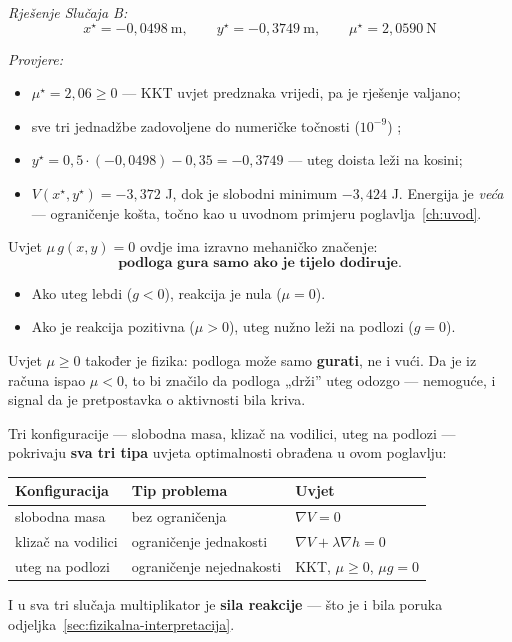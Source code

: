 \emph{Rješenje Slučaja B:}
\[
\boxed{\;
x^\star = -0{,}0498\ \text{m}, \qquad
y^\star = -0{,}3749\ \text{m}, \qquad
\mu^\star = 2{,}0590\ \text{N}
\;}
\]

\emph{Provjere:}
\begin{itemize}
  \item $\mu^\star = 2{,}06 \ge 0$ \checkmark --- KKT uvjet predznaka vrijedi,
        pa je rješenje valjano;
  \item sve tri jednadžbe zadovoljene do numeričke točnosti ($10^{-9}$)
        \checkmark;
  \item $y^\star = 0{,}5\cdot(-0{,}0498) - 0{,}35 = -0{,}3749$ \checkmark ---
        uteg doista leži na kosini;
  \item $V(x^\star,y^\star) = -3{,}372$ J, dok je slobodni minimum
        $-3{,}424$ J. Energija je \emph{veća} --- ograničenje košta, točno kao
        u uvodnom primjeru poglavlja~\ref{ch:uvod}.
\end{itemize}

\begin{teorem}
Uvjet $\mu\,g(x,y) = 0$ ovdje ima izravno mehaničko značenje:
\[
\textbf{podloga gura samo ako je tijelo dodiruje.}
\]
\begin{itemize}
  \item Ako uteg lebdi ($g < 0$), reakcija je nula ($\mu = 0$).
  \item Ako je reakcija pozitivna ($\mu > 0$), uteg nužno leži na podlozi
        ($g = 0$).
\end{itemize}
Uvjet $\mu \ge 0$ također je fizika: podloga može samo \textbf{gurati}, ne i
vući. Da je iz računa ispao $\mu < 0$, to bi značilo da podloga „drži” uteg
odozgo --- nemoguće, i signal da je pretpostavka o aktivnosti bila kriva.
\end{teorem}

\begin{napomena}
Tri konfiguracije --- slobodna masa, klizač na vodilici, uteg na podlozi ---
pokrivaju \textbf{sva tri tipa} uvjeta optimalnosti obrađena u ovom poglavlju:
\begin{center}
\begin{tabular}{lll}
\toprule
\textbf{Konfiguracija} & \textbf{Tip problema} & \textbf{Uvjet} \\
\midrule
slobodna masa & bez ograničenja & $\nabla V = 0$ \\
klizač na vodilici & ograničenje jednakosti
  & $\nabla V + \lambda\nabla h = 0$ \\
uteg na podlozi & ograničenje nejednakosti
  & KKT, $\mu \ge 0$, $\mu g = 0$ \\
\bottomrule
\end{tabular}
\end{center}
I u sva tri slučaja multiplikator je \textbf{sila reakcije} --- što je i bila
poruka odjeljka~\ref{sec:fizikalna-interpretacija}.
\end{napomena}

